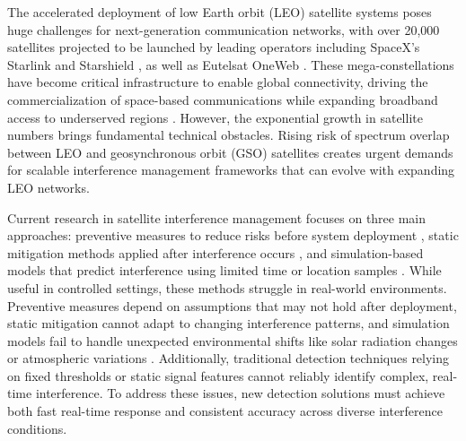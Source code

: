\documentclass[conference]{IEEEtran}
\begin{document}
The accelerated deployment of low Earth orbit (LEO) satellite systems poses huge challenges for next-generation communication networks, with over 20,000 satellites projected to be launched by leading operators including SpaceX's Starlink\cite{starlink} and Starshield \cite{spacex_starshield}, as well as Eutelsat OneWeb \cite{oneweb}. These mega-constellations have become critical infrastructure to enable global connectivity, driving the commercialization of space-based communications while expanding broadband access to underserved regions \cite{reddyLowEarthOrbit2023}. However, the exponential growth in satellite numbers brings fundamental technical obstacles. Rising risk of spectrum overlap between LEO and geosynchronous orbit (GSO) satellites creates urgent demands for scalable interference management frameworks that can evolve with expanding LEO networks.

Current research in satellite interference management focuses on three main approaches: preventive measures to reduce risks before system deployment \cite{sharmaInlineInterferenceMitigation2016, liOptimalBeamPower2019}, static mitigation methods applied after interference occurs \cite{wangCoFrequencyInterferenceAnalysis2020, zhangSpectralCoexistenceLEO2018}, and simulation-based models that predict interference using limited time or location samples \cite{wangCoFrequencyInterferenceAnalysis2020}. While useful in controlled settings, these methods struggle in real-world environments. Preventive measures depend on assumptions that may not hold after deployment, static mitigation cannot adapt to changing interference patterns, and simulation models fail to handle unexpected environmental shifts like solar radiation changes or atmospheric variations \cite{facskoSpaceWeatherEffects2023}. Additionally, traditional detection techniques relying on fixed thresholds or static signal features \cite{wangCoFrequencyInterferenceAnalysis2020} cannot reliably identify complex, real-time interference. To address these issues, new detection solutions must achieve both fast real-time response and consistent accuracy across diverse interference conditions.
\end{document}
